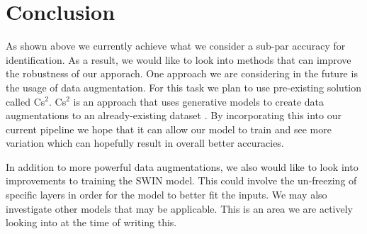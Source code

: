 \documentclass[10pt,twocolumn,letterpaper]{article}
\begin{document}
\section{Conclusion}

As shown above we currently achieve what we consider a sub-par accuracy for identification. As a result, we would like to look into methods that 
can improve the robustness of our apporach. One approach we are considering in the future is the usage of data augmentation. For this task we 
plan to use pre-existing solution called Cs$^2$. Cs$^2$ is an approach that uses generative models to create data augmentations to an 
already-existing dataset \cite{cs2}. By incorporating this into our current pipeline we hope that it can allow our model to train and see 
more variation which can hopefully result in overall better accuracies.  \par

In addition to more powerful data augmentations, we also would like to look into improvements to training the SWIN model. This could involve the un-freezing of specific layers in order for the model to better fit the inputs. We may also investigate other models that may be applicable. This is an area we are actively looking into at the time of writing this. \par 

{\small


}

\newpage
\end{document}
